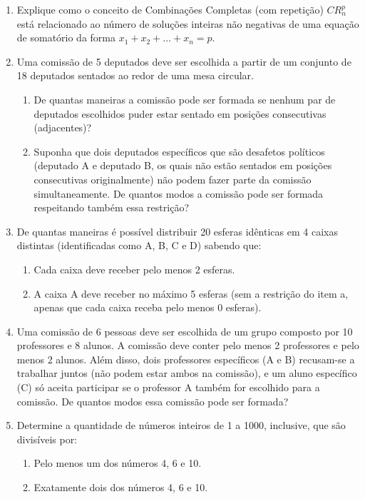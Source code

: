 \documentclass[a4paper,12pt]{letter}  %
\begin{document}
\begin{enumerate}
    \item Explique como o conceito de Combinações Completas (com repetição) $CR_n^p$ está relacionado ao número de soluções inteiras não negativas de uma equação de somatório da forma $x_1 + x_2 + \dots + x_n = p$.
    
    \item Uma comissão de 5 deputados deve ser escolhida a partir de um conjunto de 18 deputados sentados ao redor de uma mesa circular.
    \begin{enumerate}
        \item De quantas maneiras a comissão pode ser formada se nenhum par de deputados escolhidos puder estar sentado em posições consecutivas (adjacentes)?
        \item Suponha que dois deputados específicos que são desafetos políticos (deputado A e deputado B, os quais não estão sentados em posições consecutivas originalmente) não podem fazer parte da comissão simultaneamente. De quantos modos a comissão pode ser formada respeitando também essa restrição?
    \end{enumerate}

    \item De quantas maneiras é possível distribuir 20 esferas idênticas em 4 caixas distintas (identificadas como A, B, C e D) sabendo que:
    \begin{enumerate}
        \item Cada caixa deve receber pelo menos 2 esferas.
        \item A caixa A deve receber no máximo 5 esferas (sem a restrição do item a, apenas que cada caixa receba pelo menos 0 esferas).
    \end{enumerate}

    \item Uma comissão de 6 pessoas deve ser escolhida de um grupo composto por 10 professores e 8 alunos. A comissão deve conter pelo menos 2 professores e pelo menos 2 alunos. Além disso, dois professores específicos (A e B) recusam-se a trabalhar juntos (não podem estar ambos na comissão), e um aluno específico (C) só aceita participar se o professor A também for escolhido para a comissão. De quantos modos essa comissão pode ser formada?

    \item Determine a quantidade de números inteiros de 1 a 1000, inclusive, que são divisíveis por:
    \begin{enumerate}
        \item Pelo menos um dos números 4, 6 e 10.
        \item Exatamente dois dos números 4, 6 e 10.
    \end{enumerate}
\end{enumerate}
\end{document}

